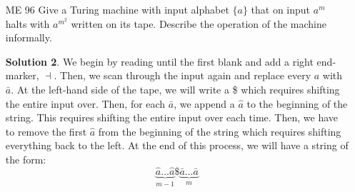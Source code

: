\documentclass{article}
\theoremstyle{definition}
\newtheorem*{solution*}{Solution}
\begin{document}
\begin{enumerate}
\begin{solution*}
		 And here is an example with a string with 6 $a$'s. 
		  \begin{align*}
		 &\vdash aaaaaa \textvisiblespace\ldots\\
		 &\vdash \hat{a}\hat{a}aaaa\dashv \textvisiblespace\ldots\quad\text{ now entering main loop}\\ 
		 &\vdash \tilde{a}\hat{a}\bar{a}aaa\dashv \textvisiblespace\ldots\\
		 &\vdash \tilde{a}\tilde{a}\bar{a}\bar{a}aa\dashv \textvisiblespace\ldots\\
		 &\vdash \hat{a}\hat{a}\hat{a}\hat{a}aa\dashv \textvisiblespace\ldots\\
		 &\vdash \tilde{a}\hat{a}\hat{a}\hat{a}\bar{a}a\dashv \textvisiblespace\ldots\\
		 &\vdash \tilde{a}\tilde{a}\hat{a}\hat{a}\bar{a}\bar{a}\dashv \textvisiblespace\ldots\\
		 &\vdash \tilde{a}\tilde{a}\tilde{a}\hat{a}\bar{a}\bar{a}\dashv \textvisiblespace\ldots\quad\text{ trying to overwrite } \dashv\ \text{ so reject}\
		 \end{align*}
		 
		 The logic behind this algorithm is that the $\hat{a}$'s keep track of the power of two that we have already seen. Then, we use the $\bar{a}$'s to double the number of $a$'s we have seen. The $\tilde{a}'$s are just there so there isn't any confusion about which $a$'s we have already processed and which we have not. Every time we finish doubling the number of $a$'s we have seen, we check if we have seen all of the string by seeing if the last character before $\dashv$ is of the form $\bar{a}$. If the string is not a power of 2, then there will be a point where, in trying to double it, we will have to go past the right end-marker and we can then reject. Since we eliminated odd length strings in the first pass, this covers all the possibilities. 
	\end{solution*}
	\item[ME 96] Give a Turing machine with input alphabet $\{a\}$ that on input $a^m$ halts
	with $a^{m^2}$ written on its tape. Describe the operation of the machine informally.
	\begin{solution*}
		We begin by reading until the first blank and add a right end-marker, $\dashv$. Then, we scan through the input again and replace every $a$ with $\bar{a}$. At the left-hand side of the tape, we will write a \$ which requires shifting the entire input over. Then, for each $\bar{a}$, we append a $\hat{a}$ to the beginning of the string. This requires shifting the entire input over each time. Then, we have to remove the first $\hat{a}$ from the beginning of the string which requires shifting everything back to the left. At the end of this process, we will have a string of the form:
		\[\underbrace{\hat{a}\ldots\hat{a}}_{m-1}\$\underbrace{\bar{a}\ldots\bar{a}}_{m}\]
		

\end{solution*}
\end{enumerate}
\end{document}
